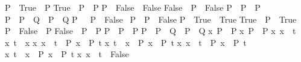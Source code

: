 \begin{isabellebody}
\begin{isamarkuptext}
\begin{itemize}
{{\isacharparenleft}P\ {\isasymand}\ True{\isacharparenright}\ {\isacharequal}\ P\isasep\isanewline%
{\isacharparenleft}True\ {\isasymand}\ P{\isacharparenright}\ {\isacharequal}\ P\isasep\isanewline%
{\isacharparenleft}P\ {\isasymand}\ False{\isacharparenright}\ {\isacharequal}\ False\isasep\isanewline%
{\isacharparenleft}False\ {\isasymand}\ P{\isacharparenright}\ {\isacharequal}\ False\isasep\isanewline%
{\isacharparenleft}P\ {\isasymand}\ P{\isacharparenright}\ {\isacharequal}\ P\isasep\isanewline%
{\isacharparenleft}P\ {\isasymand}\ P\ {\isasymand}\ Q{\isacharparenright}\ {\isacharequal}\ {\isacharparenleft}P\ {\isasymand}\ Q{\isacharparenright}\isasep\isanewline%
{\isacharparenleft}P\ {\isasymand}\ {\isasymnot}\ P{\isacharparenright}\ {\isacharequal}\ False\isasep\isanewline%
{\isacharparenleft}{\isasymnot}\ P\ {\isasymand}\ P{\isacharparenright}\ {\isacharequal}\ False\isasep\isanewline%
{\isacharparenleft}P\ {\isasymor}\ True{\isacharparenright}\ {\isacharequal}\ True\isasep\isanewline%
{\isacharparenleft}True\ {\isasymor}\ P{\isacharparenright}\ {\isacharequal}\ True\isasep\isanewline%
{\isacharparenleft}P\ {\isasymor}\ False{\isacharparenright}\ {\isacharequal}\ P\isasep\isanewline%
{\isacharparenleft}False\ {\isasymor}\ P{\isacharparenright}\ {\isacharequal}\ P\isasep\isanewline%
{\isacharparenleft}P\ {\isasymor}\ P{\isacharparenright}\ {\isacharequal}\ P\isasep\isanewline%
{\isacharparenleft}P\ {\isasymor}\ P\ {\isasymor}\ Q{\isacharparenright}\ {\isacharequal}\ {\isacharparenleft}P\ {\isasymor}\ Q{\isacharparenright}\isasep\isanewline%
{\isacharparenleft}{\isasymforall}x{\isachardot}\ P{\isacharparenright}\ {\isacharequal}\ P\isasep\isanewline%
{\isacharparenleft}{\isasymexists}x{\isachardot}\ P{\isacharparenright}\ {\isacharequal}\ P\isasep\isanewline%
{\isasymexists}x{\isachardot}\ x\ {\isacharequal}\ t\isasep\isanewline%
{\isasymexists}x{\isachardot}\ t\ {\isacharequal}\ x\isasep\isanewline%
{\isacharparenleft}{\isasymexists}x{\isachardot}\ x\ {\isacharequal}\ t\ {\isasymand}\ P\ x{\isacharparenright}\ {\isacharequal}\ P\ t\isasep\isanewline%
{\isacharparenleft}{\isasymexists}x{\isachardot}\ t\ {\isacharequal}\ x\ {\isasymand}\ P\ x{\isacharparenright}\ {\isacharequal}\ P\ t\isasep\isanewline%
{\isacharparenleft}{\isasymforall}x{\isachardot}\ x\ {\isacharequal}\ t\ {\isasymlongrightarrow}\ P\ x{\isacharparenright}\ {\isacharequal}\ P\ t\isasep\isanewline%
{\isacharparenleft}{\isasymforall}x{\isachardot}\ t\ {\isacharequal}\ x\ {\isasymlongrightarrow}\ P\ x{\isacharparenright}\ {\isacharequal}\ P\ t\isasep\isanewline%
{\isacharparenleft}{\isasymforall}x{\isachardot}\ x\ {\isasymnoteq}\ t{\isacharparenright}\ {\isacharequal}\ False\isasep\isanewline%
}
\end{itemize}
\end{isamarkuptext}
\end{isabellebody}
